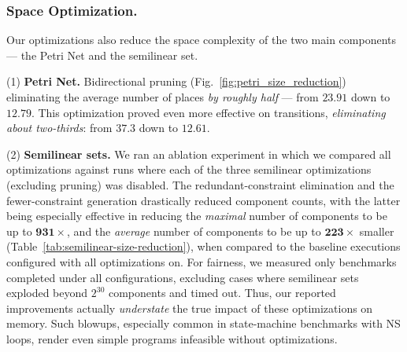 \subsubsection{Space Optimization.}
Our optimizations also reduce the space complexity of the two main components --- the Petri Net and the semilinear set.

\noindent
(1) \textbf{Petri Net.} Bidirectional pruning (Fig.~\ref{fig:petri_size_reduction}) 
eliminating the average number of places \textit{by roughly half} --- from $23.91$ down to $12.79$. This optimization proved even more effective on transitions, \textit{eliminating about two-thirds}: from $37.3$ down to $12.61$. 

\noindent
(2) \textbf{Semilinear sets.} We ran an ablation experiment in which we compared all optimizations against runs where each of the three semilinear optimizations (excluding pruning) was disabled. The redundant-constraint elimination and the fewer-constraint generation drastically reduced component counts, with the latter being especially effective in reducing the \textit{maximal} number of components to be up to $\mathbf{931\times}$, and the \textit{average} number of components to be up to $\mathbf{223\times}$ smaller (Table~\ref{tab:semilinear-size-reduction}), when compared to the baseline executions configured with all optimizations on. 
%
For fairness, we measured only benchmarks completed under all configurations, excluding cases where semilinear sets exploded beyond $2^{30}$ components and timed out. Thus, our reported improvements actually \textit{understate} the true impact of these optimizations on memory. Such blowups, especially common in state-machine benchmarks with NS loops, render even simple programs infeasible without optimizations.
	
